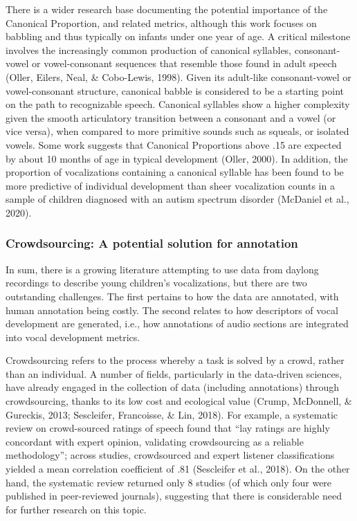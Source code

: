 \documentclass[english,,man]{apa6}
\begin{document}
There is a wider research base documenting the potential importance of the Canonical Proportion, and related metrics, although this work focuses on babbling and thus typically on infants under one year of age. A critical milestone involves the increasingly common production of canonical syllables, consonant-vowel or vowel-consonant sequences that resemble those found in adult speech (Oller, Eilers, Neal, \& Cobo-Lewis, 1998). Given its adult-like consonant-vowel or vowel-consonant structure, canonical babble is considered to be a starting point on the path to recognizable speech. Canonical syllables show a higher complexity given the smooth articulatory transition between a consonant and a vowel (or vice versa), when compared to more primitive sounds such as squeals, or isolated vowels. Some work suggests that Canonical Proportions above .15 are expected by about 10 months of age in typical development (Oller, 2000). In addition, the proportion of vocalizations containing a canonical syllable has been found to be more predictive of individual development than sheer vocalization counts in a sample of children diagnosed with an autism spectrum disorder (McDaniel et al., 2020).

\hypertarget{crowdsourcing-a-potential-solution-for-annotation}{%
\subsubsection{Crowdsourcing: A potential solution for annotation}\label{crowdsourcing-a-potential-solution-for-annotation}}

In sum, there is a growing literature attempting to use data from daylong recordings to describe young children's vocalizations, but there are two outstanding challenges. The first pertains to how the data are annotated, with human annotation being costly. The second relates to how descriptors of vocal development are generated, i.e., how annotations of audio sections are integrated into vocal development metrics.

Crowdsourcing refers to the process whereby a task is solved by a crowd, rather than an individual. A number of fields, particularly in the data-driven sciences, have already engaged in the collection of data (including annotations) through crowdsourcing, thanks to its low cost and ecological value (Crump, McDonnell, \& Gureckis, 2013; Sescleifer, Francoisse, \& Lin, 2018). For example, a systematic review on crowd-sourced ratings of speech found that \enquote{lay ratings are highly concordant with expert opinion, validating crowdsourcing as a reliable methodology}; across studies, crowdsourced and expert listener classifications yielded a mean correlation coefficient of .81 (Sescleifer et al., 2018). On the other hand, the systematic review returned only 8 studies (of which only four were published in peer-reviewed journals), suggesting that there is considerable need for further research on this topic.
\end{document}
